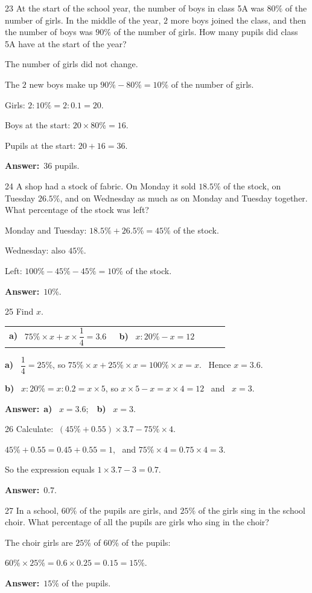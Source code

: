\documentclass[11pt]{article}
\makeatletter
\newif\ifsol \solfalse
\renewcommand{\arraystretch}{1.35}
\providecommand{\AnsWord}{Đáp số}
\newcommand{\dapso}[1]{\par\textbf{\AnsWord:}\ #1}
\newcommand{\probsol}[1]{%
  \begin{lrbox}{\solmeasure}\begin{minipage}{\dimexpr\linewidth-24pt\relax}#1\end{minipage}\end{lrbox}%
  \ifsol
    \begin{solbox}#1\end{solbox}%
  \else
    \setlength{\solht}{\dimexpr\ht\solmeasure+\dp\solmeasure+0.85cm\relax}%
    \ifdim\solht<1.35cm\setlength{\solht}{1.35cm}\fi
    \begin{tcolorbox}[colback=white,colframe=Line,boxrule=0.8pt,arc=5pt,
      left=8pt,right=8pt,top=4pt,bottom=4pt,height=\solht]{\footnotesize\color{Slate}\itshape\WorkWord}\end{tcolorbox}%
  \fi}
\newcommand{\pa}[1]{\textbf{#1)}\ }
\newenvironment{cols2}{\par\vspace{3pt}\noindent\setlength{\tabcolsep}{0pt}\renewcommand{\arraystretch}{1.3}%
  \begin{tabular}{@{}>{\raggedright\arraybackslash\rule{0pt}{4.4ex}}p{0.48\linewidth}<{\rule[-2.3ex]{0pt}{0pt}}@{\hspace{0.03\linewidth}}>{\raggedright\arraybackslash\rule{0pt}{4.4ex}}p{0.48\linewidth}<{\rule[-2.3ex]{0pt}{0pt}}@{}}}%
  {\end{tabular}\par}
\newcommand{\gap}{\vspace{0.3cm}}
\def\WorkWord{Your work:}
\def\AnsWord{Answer}
\makeatother
\begin{document}
\gap
\begin{probbox}{23}{\relax}
At the start of the school year, the number of boys in class 5A was $80\%$ of the number of girls. In the middle of the year, $2$ more boys joined the class, and then the number of boys was $90\%$ of the number of girls. How many pupils did class 5A have at the start of the year?
\end{probbox}
\probsol{
The number of girls did not change.\par
The $2$ new boys make up $90\%-80\%=10\%$ of the number of girls.\par
Girls: $2:10\%=2:0.1=20$.\par
Boys at the start: $20\times80\%=16$.\par
Pupils at the start: $20+16=36$.
\dapso{$36$ pupils.}}
\gap
\begin{probbox}{24}{\relax}
A shop had a stock of fabric. On Monday it sold $18.5\%$ of the stock, on Tuesday $26.5\%$, and on Wednesday as much as on Monday and Tuesday together. What percentage of the stock was left?
\end{probbox}
\probsol{
Monday and Tuesday: $18.5\%+26.5\%=45\%$ of the stock.\par
Wednesday: also $45\%$.\par
Left: $100\%-45\%-45\%=10\%$ of the stock.
\dapso{$10\%$.}}
\gap
\begin{probbox}{25}{\relax}
Find $x$.
\begin{cols2}
\pa{a} $75\%\times x+x\times\dfrac14=3.6$ & \pa{b} $x:20\%-x=12$
\end{cols2}
\end{probbox}
\probsol{
\pa{a} $\dfrac14=25\%$, so $75\%\times x+25\%\times x=100\%\times x=x$. \ Hence $x=3.6$.\par
\pa{b} $x:20\%=x:0.2=x\times5$, so $x\times5-x=x\times4=12$ \ and \ $x=3$.
\dapso{\pa{a} $x=3.6$;\ \ \pa{b} $x=3$.}}
\gap
\begin{probbox}{26}{\relax}
Calculate: $\ (45\%+0.55)\times3.7-75\%\times4$.
\end{probbox}
\probsol{
$45\%+0.55=0.45+0.55=1$, \ and $75\%\times4=0.75\times4=3$.\par
So the expression equals $1\times3.7-3=0.7$.
\dapso{$0.7$.}}
\gap
\begin{probbox}{27}{\relax}
In a school, $60\%$ of the pupils are girls, and $25\%$ of the girls sing in the school choir. What percentage of all the pupils are girls who sing in the choir?
\end{probbox}
\probsol{
The choir girls are $25\%$ of $60\%$ of the pupils:\par
$60\%\times25\%=0.6\times0.25=0.15=15\%$.
\dapso{$15\%$ of the pupils.}}
\end{document}

